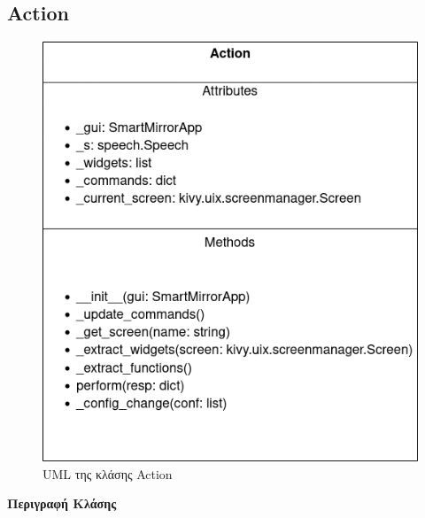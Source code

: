 \subsection{Action}
\begin{figure}[h]
    \centering
    \includegraphics[scale=0.7]{images/chapter4/uml_diagrams/Action.png}
    \caption{UML της κλάσης Action}
    \label{fig:action}
\end{figure}
\noindent\textbf{Περιγραφή Κλάσης}

